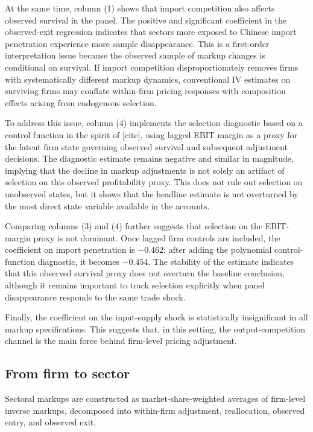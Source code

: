 \documentclass[12pt]{article}
\newcommand{\textcite}[2][]{[cite]}
\begin{document}
At the same time, column (1) shows that import competition also affects observed survival in the panel. The positive and significant coefficient in the observed-exit regression indicates that sectors more exposed to Chinese import penetration experience more sample disappearance. This is a first-order interpretation issue because the observed sample of markup changes is conditional on survival. If import competition disproportionately removes firms with systematically different markup dynamics, conventional IV estimates on surviving firms may conflate within-firm pricing responses with composition effects arising from endogenous selection.

To address this issue, column (4) implements the selection diagnostic based on a control function in the spirit of \textcite{backusWhyProductivityCorrelated2020,pavcnikTradeLiberalizationExit2002}, using lagged EBIT margin as a proxy for the latent firm state governing observed survival and subsequent adjustment decisions. The diagnostic estimate remains negative and similar in magnitude, implying that the decline in markup adjustments is not solely an artifact of selection on this observed profitability proxy. This does not rule out selection on unobserved states, but it shows that the headline estimate is not overturned by the most direct state variable available in the accounts.

Comparing columns (3) and (4) further suggests that selection on the EBIT-margin proxy is not dominant. Once lagged firm controls are included, the coefficient on import penetration is $-0.462$; after adding the polynomial control-function diagnostic, it becomes $-0.454$. The stability of the estimate indicates that this observed survival proxy does not overturn the baseline conclusion, although it remains important to track selection explicitly when panel disappearance responds to the same trade shock.

Finally, the coefficient on the input-supply shock is statistically insignificant in all markup specifications. This suggests that, in this setting, the output-competition channel is the main force behind firm-level pricing adjustment.

\subsection{From firm to sector}

Sectoral markups are constructed as market-share-weighted averages of firm-level inverse markups, decomposed into within-firm adjustment, reallocation, observed entry, and observed exit.
\end{document}
